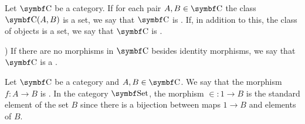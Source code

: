 \begin{definition}\label{def:category_cardinality}
  Let \( \Cat{C} \) be a category. If for each pair \( A, B \in \Cat{C} \) the class \( \Cat{C}(A, B) \) is a set, we say that \( \Cat{C} \) is . If, in addition to this, the class of objects is a set, we say that \( \Cat{C} \) is .
\end{definition}

\begin{definition}\label{def:discrete_category}\cite[example 1.1.18(b]{Leinster2014})
  If there are no morphisms in \( \Cat{C} \) besides identity morphisms, we say that \( \Cat{C} \) is a .
\end{definition}

\begin{definition}\label{def:generalized_element}\cite[definition 4.1.25]{Leinster2014}
  Let \( \Cat{C} \) be a category and \( A, B \in \Cat{C} \). We say that the morphism \( f: A \to B \) is . In the category \( \Cat{Set} \), the morphism \( \in : 1 \to B \) is the standard element of the set \( B \) since there is a bijection between maps \( 1 \to B \) and elements of \( B \).
\end{definition}

